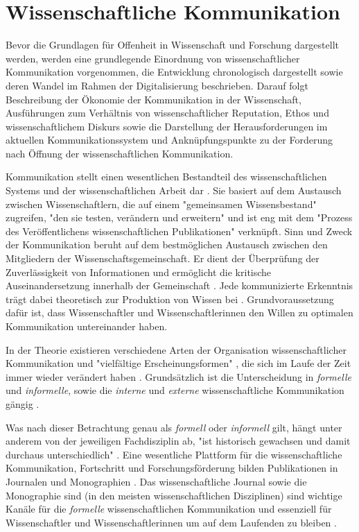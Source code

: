 \section{Wissenschaftliche Kommunikation}

Bevor die Grundlagen für Offenheit in Wissenschaft und Forschung dargestellt werden, werden eine grundlegende Einordnung von wissenschaftlicher Kommunikation vorgenommen, die Entwicklung chronologisch dargestellt sowie deren Wandel im Rahmen der Digitalisierung beschrieben. Darauf folgt Beschreibung der Ökonomie der Kommunikation in der Wissenschaft, Ausführungen zum Verhältnis von wissenschaftlicher Reputation, Ethos und wissenschaftlichem Diskurs sowie die Darstellung der Herausforderungen im aktuellen Kommunikationssystem und Anknüpfungspunkte zu der Forderung nach Öffnung der wissenschaftlichen Kommunikation.

Kommunikation stellt einen wesentlichen Bestandteil des wissenschaftlichen Systems und der wissenschaftlichen Arbeit dar \cite{garvey_2014_communication} \cite[:63]{Luhmann1998}. Sie basiert auf dem Austausch zwischen Wissenschaftlern, die auf einem "gemeinsamen Wissensbestand" zugreifen, "den sie testen, verändern und erweitern" \cite{Gl_ser_2007} und ist eng mit dem "Prozess des Veröffentlichens wissenschaftlichen Publikationen" \cite{weller2011twitter} verknüpft. Sinn und Zweck der Kommunikation beruht auf dem bestmöglichen Austausch zwischen den Mitgliedern der Wissenschaftsgemeinschaft. Er dient der Überprüfung der Zuverlässigkeit von Informationen und ermöglicht die kritische Auseinandersetzung innerhalb der Gemeinschaft \cite{fox_1983_publication}. Jede kommunizierte Erkenntnis trägt dabei theoretisch zur Produktion von Wissen bei \cite{kaden_2009_library}. Grundvoraussetzung dafür ist, dass Wissenschaftler und Wissenschaftlerinnen den Willen zu optimalen Kommunikation untereinander haben.

In der Theorie existieren verschiedene Arten der Organisation wissenschaftlicher Kommunikation und "vielfältige Erscheinungsformen" \cite{graefen2007_wissenschaftliche_artikel}, die sich im Laufe der Zeit immer wieder verändert haben \cite{Konneker_2013} \cite{hagner_2015_sache_buches}. Grundsätzlich ist die Unterscheidung in \textit{formelle} und \textit{informelle}, sowie die \textit{interne} und \textit{externe} wissenschaftliche Kommunikation gängig \cite{suchen}.

Was nach dieser Betrachtung genau als \textit{formell} oder \textit{informell} gilt, hängt unter anderem von der jeweiligen Fachdisziplin ab, "ist historisch gewachsen und damit durchaus unterschiedlich" \cite{Hanekop_2014}. Eine wesentliche Plattform für die wissenschaftliche Kommunikation, Fortschritt und Forschungsförderung bilden Publikationen in Journalen und Monographien \cite{cope2014future} \cite{fox_1983_publication}. Das wissenschaftliche Journal sowie die Monographie sind (in den meisten wissenschaftlichen Disziplinen) sind wichtige Kanäle für die \textit{formelle} wissenschaftlichen Kommunikation und essenziell für Wissenschaftler und Wissenschaftlerinnen um auf dem Laufenden zu bleiben \cite{cope2014future}.

